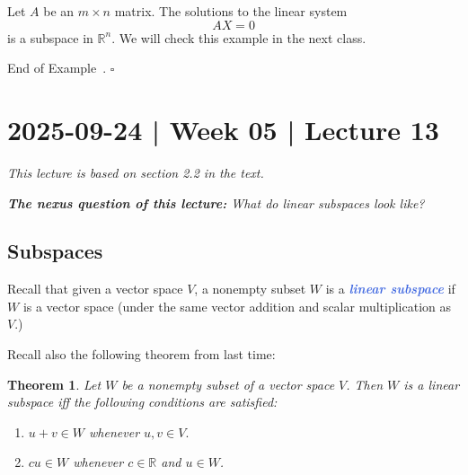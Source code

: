\documentclass[10pt]{article}
\newcommand{\demph}[1]{\textcolor{RoyalBlue}{\textbf{\slshape #1}}} %
\newtheorem{theorem}{Theorem}
\theoremstyle{definition}
\newtheorem{example}[theorem]{Example}
\renewenvironment{example}
{\begin{oldexample}}
  {\par\smallskip\hfill   End of Example~\theexample. $\square$    \par\end{oldexample}}
\newcommand{\R}{\mathbb{R}}           %
\begin{document}
\begin{example}[Important example]
  Let $A$ be an $m\times n$ matrix. The solutions to the linear system
  \begin{equation*}
    AX=0
  \end{equation*}
  is a subspace in $\R^{n}$. We will check this example in the next class.
\end{example}

\newpage
\section{2025-09-24 | Week 05 | Lecture 13}
\textit{This lecture is based on section 2.2 in the text.}

\begin{center}
  \begin{tcolorbox}[width=0.9\textwidth, colback=white, colframe=black]
    \textit{\textbf{The nexus question of this lecture:} What do linear
      subspaces look like?}
  \end{tcolorbox}
\end{center}

\subsection{Subspaces}
Recall that given a vector space $V$, a nonempty subset $W$ is a \demph{linear
subspace} if $W$ is a vector space (under the same vector addition and scalar
multiplication as $V$.)

Recall also the following theorem from last time:

\begin{theorem}
  \label{thm:subspace-criteria}
  Let $W$ be a nonempty subset of a vector space $V$. Then $W$ is a linear subspace
  iff the following conditions are satisfied:
  \begin{enumerate}[label=(\roman*.)]
    \item $u+v\in W$ whenever $u,v\in V.$
    \item $cu\in W$ whenever $c\in \R$ and $u\in W$.
  \end{enumerate}
\end{theorem}
\end{document}
